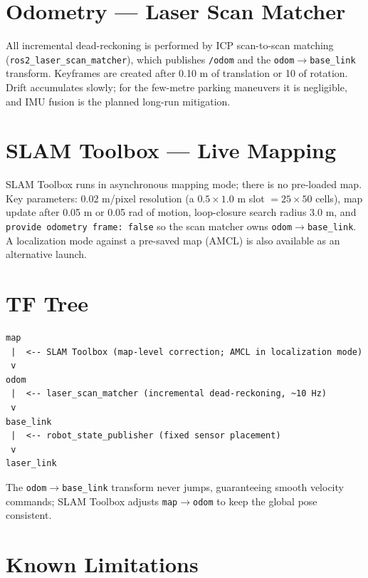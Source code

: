 \documentclass[12pt,a4paper]{report}
\begin{document}
\section{Odometry --- Laser Scan Matcher}

All incremental dead-reckoning is performed by ICP scan-to-scan matching
(\texttt{ros2\_laser\_scan\_matcher}), which publishes \texttt{/odom} and the
\texttt{odom$\rightarrow$base\_link} transform. Keyframes are created after
0.10 m of translation or 10\textdegree{} of rotation. Drift accumulates slowly;
for the few-metre parking maneuvers it is negligible, and IMU fusion is the
planned long-run mitigation.

\section{SLAM Toolbox --- Live Mapping}

SLAM Toolbox runs in asynchronous mapping mode; there is no pre-loaded map. Key
parameters: 0.02 m/pixel resolution (a $0.5\times1.0$ m slot $= 25\times50$
cells), map update after 0.05 m or 0.05 rad of motion, loop-closure search radius
3.0 m, and \texttt{provide odometry frame: false} so the scan matcher owns
\texttt{odom$\rightarrow$base\_link}. A localization mode against a pre-saved map
(AMCL) is also available as an alternative launch.

\section{TF Tree}

\begin{lstlisting}
map
 |  <-- SLAM Toolbox (map-level correction; AMCL in localization mode)
 v
odom
 |  <-- laser_scan_matcher (incremental dead-reckoning, ~10 Hz)
 v
base_link
 |  <-- robot_state_publisher (fixed sensor placement)
 v
laser_link
\end{lstlisting}

The \texttt{odom$\rightarrow$base\_link} transform never jumps, guaranteeing
smooth velocity commands; SLAM Toolbox adjusts \texttt{map$\rightarrow$odom} to
keep the global pose consistent.

\section{Known Limitations}
\end{document}
